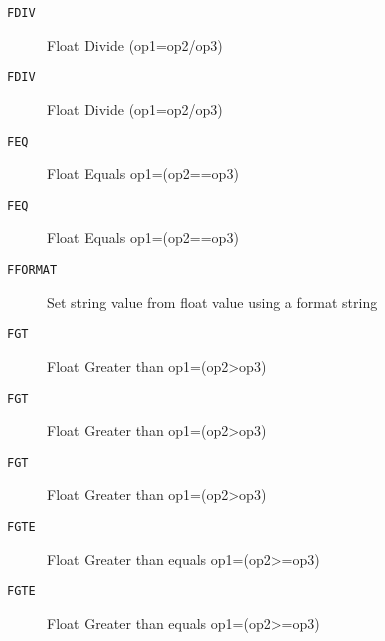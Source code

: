 
\begin{description}
\item[\texttt{FDIV       }]  Float Divide (op1=op2/op3)\\
\end{description}

\begin{description}
\item[\texttt{FDIV       }]  Float Divide (op1=op2/op3)\\
\end{description}

\begin{description}
\item[\texttt{FEQ        }]  Float Equals op1=(op2==op3)\\
\end{description}

\begin{description}
\item[\texttt{FEQ        }]  Float Equals op1=(op2==op3)\\
\end{description}

\begin{description}
\item[\texttt{FFORMAT    }]  Set string value from float value using a format string\\
\end{description}

\begin{description}
\item[\texttt{FGT        }]  Float Greater than op1=(op2>op3)\\
\end{description}

\begin{description}
\item[\texttt{FGT        }]  Float Greater than op1=(op2>op3)\\
\end{description}

\begin{description}
\item[\texttt{FGT        }]  Float Greater than op1=(op2>op3)\\
\end{description}

\begin{description}
\item[\texttt{FGTE       }]  Float Greater than equals op1=(op2>=op3)\\
\end{description}

\begin{description}
\item[\texttt{FGTE       }]  Float Greater than equals op1=(op2>=op3)\\
\end{description}
